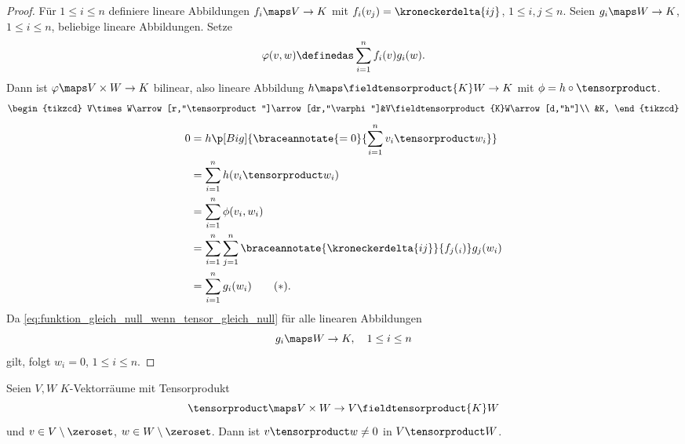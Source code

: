 \begin{proof}
  Für \( 1\leq i\leq n \) definiere lineare Abbildungen \( f_i\maps V\to K \) mit \( f_i(v_j)=\kroneckerdelta{ij} \), \( 1\leq i,j\leq n \). Seien \( g_i\maps W\to K \), \( 1\leq i\leq n \), beliebige lineare Abbildungen. Setze 
  \begin{equation*}
    \varphi(v,w)\definedas \sum_{i=1}^{n}f_i(v)g_i(w).
  \end{equation*}
  Dann ist \( \varphi\maps V\times W\to K \) bilinear, also \texistsone lineare Abbildung \( h\maps \fieldtensorproduct{K}W\to K \) mit \( \phi=h\circ \tensorproduct \).
  \begin{equation*}
    \begin{tikzcd}
      V\times W\arrow[r,"\tensorproduct"]\arrow[dr,"\varphi"]&V\fieldtensorproduct{K}W\arrow[d,"h"]\\
      &K,
    \end{tikzcd}
  \end{equation*}
  \dh
  \begin{align*}
    0&=h\p[Big]{\braceannotate{=0}{\sum_{i=1}^{n}v_i\tensorproduct w_i}}\\
    &=\sum_{i=1}^{n}h(v_i\tensorproduct w_i)\\
    &=\sum_{i=1}^{n}\phi(v_i,w_i)\\
    &=\sum_{i=1}^{n}\sum_{j=1}^{n}\braceannotate{\kroneckerdelta{ij}}{f_j(_i)}g_j(w_i)\\
    &=\sum_{i=1}^{n}g_i(w_i)\tag{\( * \)}\label{eq:funktion_gleich_null_wenn_tensor_gleich_null}.
  \end{align*}
  Da \eqref{eq:funktion_gleich_null_wenn_tensor_gleich_null} für alle linearen Abbildungen
  \begin{equation*}
    g_i\maps W\to K,\quad 1\leq i\leq n
  \end{equation*}
  gilt, folgt \( w_i=0 \), \( 1\leq i\leq n \).
\end{proof}
\begin{korollar}
  Seien \( V,W \) \( K \)-Vektorräume mit Tensorprodukt
  \begin{equation*}
    \tensorproduct\maps V\times W\to V\fieldtensorproduct{K}W 
  \end{equation*}
  und \( v\in V\setminus \zeroset \), \( w\in W\setminus \zeroset  \). Dann ist \( v\tensorproduct w\neq 0 \) in \( V\tensorproduct W \).
\end{korollar}